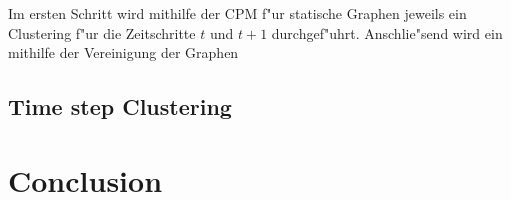 \documentclass[journal]{vgtc}
\begin{document}
    Im ersten Schritt wird mithilfe der CPM f"ur statische Graphen jeweils ein Clustering  f"ur die Zeitschritte $t$ und $t+1$ durchgef"uhrt.
    Anschlie"send wird ein mithilfe der Vereinigung der Graphen 
  \subsection{Time step Clustering}
 
\section{Conclusion}



\end{document}
